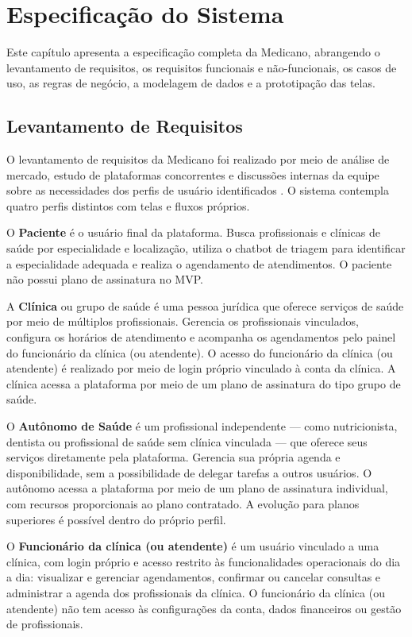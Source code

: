 \chapter{Especificação do Sistema}
\label{chap:specification}

Este capítulo apresenta a especificação completa da
Medicano, abrangendo o levantamento de requisitos,
os requisitos funcionais e não-funcionais, os casos
de uso, as regras de negócio, a modelagem de dados
e a prototipação das telas.

\section{Levantamento de Requisitos}
\label{sec:requirements-gathering}

O levantamento de requisitos da Medicano foi realizado
por meio de análise de mercado, estudo de plataformas
concorrentes e discussões internas da equipe sobre
as necessidades dos perfis de usuário identificados
\cite{sommerville2011}. O sistema contempla quatro
perfis distintos com telas e fluxos próprios.

O \textbf{Paciente} é o usuário final da plataforma.
Busca profissionais e clínicas de saúde por
especialidade e localização, utiliza o chatbot de
triagem para identificar a especialidade adequada
e realiza o agendamento de atendimentos. O paciente
não possui plano de assinatura no MVP.

A \textbf{Clínica} ou grupo de saúde é uma pessoa
jurídica que oferece serviços de saúde por meio de
múltiplos profissionais. Gerencia os profissionais
vinculados, configura os horários de atendimento e
acompanha os agendamentos pelo painel do funcionário
da clínica (ou atendente). O acesso do funcionário
da clínica (ou atendente) é realizado por meio de
login próprio vinculado à conta da clínica. A clínica
acessa a plataforma por meio de um plano de assinatura
do tipo grupo de saúde.

O \textbf{Autônomo de Saúde} é um profissional
independente --- como nutricionista, dentista ou
profissional de saúde sem clínica vinculada --- que
oferece seus serviços diretamente pela plataforma.
Gerencia sua própria agenda e disponibilidade, sem
a possibilidade de delegar tarefas a outros usuários.
O autônomo acessa a plataforma por meio de um plano
de assinatura individual, com recursos proporcionais
ao plano contratado. A evolução para planos superiores
é possível dentro do próprio perfil.

O \textbf{Funcionário da clínica (ou atendente)} é
um usuário vinculado a uma clínica, com login próprio
e acesso restrito às funcionalidades operacionais do
dia a dia: visualizar e gerenciar agendamentos,
confirmar ou cancelar consultas e administrar a agenda
dos profissionais da clínica. O funcionário da clínica
(ou atendente) não tem acesso às configurações da
conta, dados financeiros ou gestão de profissionais.

